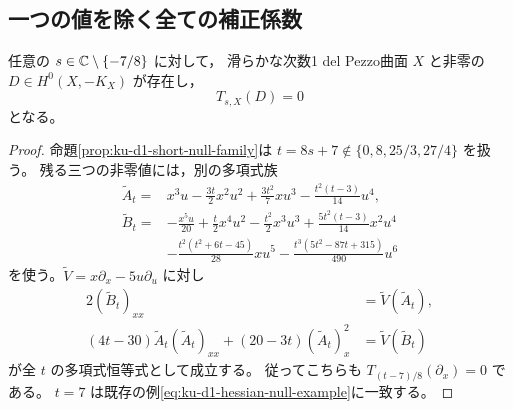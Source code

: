 \subsection{一つの値を除く全ての補正係数}

\begin{theorem}[ほぼ全ての候補に対する滑らかな零方向]
\label{thm:ku-d1-candidate-smooth-null}
任意の $s\in\mathbb C\setminus\{-7/8\}$ に対して，
滑らかな次数1 del Pezzo曲面 $X$ と非零の $D\in H^0(X,-K_X)$ が存在し，
\[
                             T_{s,X}(D)=0
\]
となる。
\end{theorem}
\begin{proof}
命題\ref{prop:ku-d1-short-null-family}は
$t=8s+7\notin\{0,8,25/3,27/4\}$ を扱う。
残る三つの非零値には，別の多項式族
\begin{equation}\label{eq:ku-d1-long-null-family}
 \begin{split}
 \widetilde A_t={}&x^3u-\frac{3t}{2}x^2u^2
       +\frac{3t^2}{7}xu^3-\frac{t^2(t-3)}{14}u^4,\\
 \widetilde B_t={}&-\frac{x^5u}{20}+\frac t2x^4u^2
       -\frac{t^2}{2}x^3u^3+\frac{5t^2(t-3)}{14}x^2u^4\\
       &-\frac{t^2(t^2+6t-45)}{28}xu^5
       -\frac{t^3(5t^2-87t+315)}{490}u^6
 \end{split}
\end{equation}
を使う。$\widetilde V=x\partial_x-5u\partial_u$ に対し
\[
 \begin{split}
 2(\widetilde B_t)_{xx}&=\widetilde V(\widetilde A_t),\\
 (4t-30)\widetilde A_t(\widetilde A_t)_{xx}
 +(20-3t)(\widetilde A_t)_x^2&=\widetilde V(\widetilde B_t)
 \end{split}
\]
が全 $t$ の多項式恒等式として成立する。
従ってこちらも $T_{(t-7)/8}(\partial_x)=0$ である。
$t=7$ は既存の例\eqref{eq:ku-d1-hessian-null-example}に一致する。


\end{proof}
